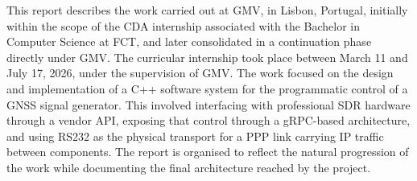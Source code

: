 
%

This report describes the work carried out at \gls{GMV}, in Lisbon, Portugal,
initially within the scope of the \gls{CDA} internship associated with the
Bachelor in Computer Science at \gls{FCT}, and later consolidated in a
continuation phase directly under \gls{GMV}. The curricular internship took
place between March 11 and July 17, 2026, under the supervision of
\gls{GMV}. The work focused on the design and implementation of a C++ software
system for the programmatic control of a \gls{GNSS} signal
generator. This involved interfacing with professional \gls{SDR} hardware
through a vendor API, exposing that control through a gRPC-based architecture,
and using \gls{RS232} as the physical transport for a \gls{PPP} link carrying
IP traffic between components. The report is organised to reflect the natural
progression of the work while documenting the final architecture reached by the
project.
